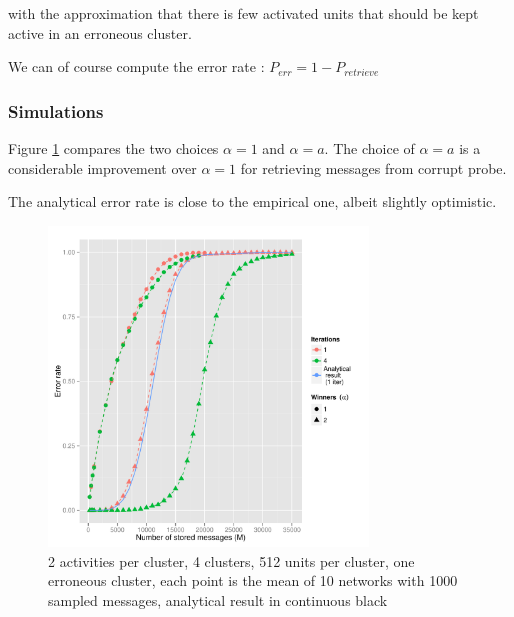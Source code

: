 \documentclass[english,10pt,twocolumn]{IEEEtran}
\theoremstyle{definition}
\begin{document}
	with the approximation that there is few activated units that should be kept active in an erroneous cluster.

	
	We can of course compute the error rate : $P_{err} = 1 - P_{retrieve}$	

	
	
	\subsubsection{Simulations}
	Figure \ref{corruptth} compares the two choices $\alpha = 1$ and $\alpha = a$. The choice of $\alpha = a$ is a considerable improvement over $\alpha = 1$ for retrieving messages from corrupt probe.
	
	The analytical error rate is close to the empirical one, albeit slightly optimistic.
	
	\begin{figure}[!htb]
		\includegraphics[width=8.5cm]{Courbes/fig4c4l512a2e1corr}%
		\caption{2 activities per cluster, 4 clusters, 512 units per cluster, one erroneous cluster, each point is the mean of 10 networks with 1000 sampled messages, analytical result in continuous black}
		\label{corruptth}
	\end{figure}
		
\end{document}
